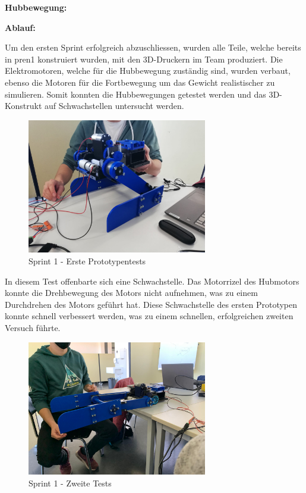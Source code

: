 \textbf{Hubbewegung:}

\textbf{Ablauf:}

Um den ersten Sprint erfolgreich abzuschliessen, wurden alle Teile, welche bereits in \acrshort{pren1} konstruiert wurden, mit den 3D-Druckern im Team produziert. Die Elektromotoren, welche für die Hubbewegung zuständig sind, wurden verbaut, ebenso die Motoren für die Fortbewegung um das Gewicht realistischer zu simulieren. Somit konnten die Hubbewegungen getestet werden und das 3D-Konstrukt auf Schwachstellen untersucht werden.

\begin{figure}[H]
  \includegraphics[width=0.7\textwidth]{img/Sprint1/pren1_sprint1_1.png}
  \centering
  \caption{Sprint 1 - Erste Prototypentests}
  \label{fig:erstePrototypentests}
\end{figure}

\newpage

In diesem Test offenbarte sich eine Schwachstelle. Das Motorrizel des Hubmotors konnte die Drehbewegung des Motors nicht aufnehmen, was zu einem Durchdrehen des Motors geführt hat.
Diese Schwachstelle des ersten Prototypen konnte schnell verbessert  werden, was zu einem schnellen, erfolgreichen zweiten Versuch führte.

\begin{figure}[H]
  \includegraphics[width=0.7\textwidth]{img/Sprint1/pren1_sprint1_2.png}
  \centering
  \caption{Sprint 1 - Zweite Tests}
  \label{fig:zweiteTests}
\end{figure}

